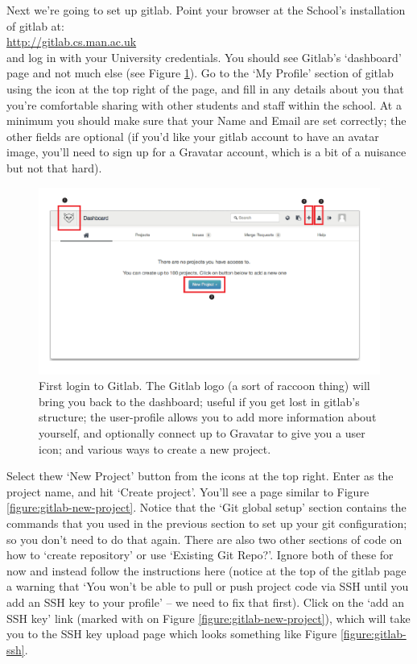 Next we're going to set up gitlab. Point your browser at the School's installation of gitlab at:
\\
\url{http://gitlab.cs.man.ac.uk}
\\
and log in with your University credentials. You should see Gitlab's `dashboard' page and not much else (see Figure \ref{figure:gitlab-first-login}). Go to the `My Profile' section of gitlab using the icon at the top right of the page, and fill in any details about you that you're comfortable sharing with other students and staff within the school. At a minimum you should make sure that your Name and Email are set correctly; the other fields are optional (if you'd like your gitlab account to have an avatar image, you'll need to sign up for a Gravatar account, which is a bit of a nuisance but not that hard). 

\begin{figure}
\centerline{\includegraphics[width=15cm]{images/gitlab-first-login}}
\caption{First login to Gitlab. \protect{} The Gitlab logo (a sort of raccoon thing) will bring you back to the dashboard; useful if you get lost in gitlab's structure; \protect{} the user-profile allows you to add more information about yourself, and optionally connect up to Gravatar to give you a user icon; and \protect{} various ways to create a new project.}\label{figure:gitlab-first-login}
\end{figure}

Select thew `New Project' button from the icons at the top right. Enter  as the project name, and hit `Create project'. You'll see a page similar to Figure \ref{figure:gitlab-new-project}. Notice that the `Git global setup' section contains the commands that you used in the previous section to set up your git configuration; so you don't need to do that again. There are also two other sections of code on how to `create repository' or use `Existing Git Repo?'. Ignore both of these for now and instead follow the instructions here (notice at the top of the gitlab page a warning that `You won't be able to pull or push project code via SSH until you add an SSH key to your profile' -- we need to fix that first). Click on the `add an SSH key' link (marked with \protect{} on Figure \ref{figure:gitlab-new-project}), which will take you to the SSH key upload page which looks something like Figure \ref{figure:gitlab-ssh}.

